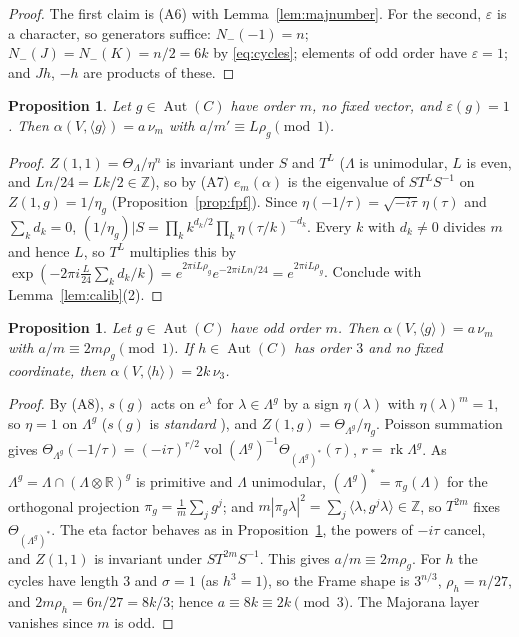 \documentclass[11pt]{amsart}
\newtheorem{proposition}[theorem]{Proposition}
\theoremstyle{definition}
\newcommand{\Z}{\mathbb{Z}}
\newcommand{\R}{\mathbb{R}}
\newcommand{\Aut}{\operatorname{Aut}}
\begin{document}
\begin{proof}
The first claim is (A6) with Lemma~\ref{lem:majnumber}. For the second, $\varepsilon$ is a character, so
generators suffice: $N_-(-1)=n$; $N_-(J)=N_-(K)=n/2=6k$ by \eqref{eq:cycles}; elements of odd order have
$\varepsilon=1$; and $Jh$, $-h$ are products of these.
\end{proof}

\begin{proposition}\label{prop:frame}
Let $g\in\Aut(C)$ have order $m$, no fixed vector, and $\varepsilon(g)=1$. Then
$\alpha(V,\langle g\rangle)=a\,\nu_m$ with $a/m'\equiv L\rho_g\pmod1$.
\end{proposition}

\begin{proof}
$Z(1,1)=\Theta_\Lambda/\eta^n$ is invariant under $S$ and $T^L$ ($\Lambda$ is unimodular, $L$ is even,
and $Ln/24=Lk/2\in\Z$), so by (A7) $e_m(\alpha)$ is the eigenvalue of $ST^LS^{-1}$ on
$Z(1,g)=1/\eta_g$ (Proposition~\ref{prop:fpf}). Since $\eta(-1/\tau)=\sqrt{-i\tau}\,\eta(\tau)$ and
$\sum_kd_k=0$, $(1/\eta_g)|S=\prod_kk^{d_k/2}\prod_k\eta(\tau/k)^{-d_k}$. Every $k$ with $d_k\ne0$
divides $m$ and hence $L$, so $T^L$ multiplies this by
$\exp(-2\pi i\frac L{24}\sum_kd_k/k)=e^{2\pi iL\rho_g}e^{-2\pi iLn/24}=e^{2\pi iL\rho_g}$. Conclude with
Lemma~\ref{lem:calib}(2).
\end{proof}

\begin{proposition}\label{prop:odd}
Let $g\in\Aut(C)$ have odd order $m$. Then $\alpha(V,\langle g\rangle)=a\,\nu_m$ with
$a/m\equiv2m\rho_g\pmod1$. If $h\in\Aut(C)$ has order $3$ and no fixed coordinate, then
$\alpha(V,\langle h\rangle)=2k\,\nu_3$.
\end{proposition}

\begin{proof}
By (A8), $s(g)$ acts on $e^\lambda$ for $\lambda\in\Lambda^g$ by a sign $\eta(\lambda)$ with
$\eta(\lambda)^m=1$, so $\eta=1$ on $\Lambda^g$ ($s(g)$ is \emph{standard} \cite{Lep}), and
$Z(1,g)=\Theta_{\Lambda^g}/\eta_g$. Poisson summation gives
$\Theta_{\Lambda^g}(-1/\tau)=(-i\tau)^{r/2}\operatorname{vol}(\Lambda^g)^{-1}\Theta_{(\Lambda^g)^*}(\tau)$,
$r=\operatorname{rk}\Lambda^g$. As $\Lambda^g=\Lambda\cap(\Lambda\otimes\R)^g$ is primitive and $\Lambda$
unimodular, $(\Lambda^g)^*=\pi_g(\Lambda)$ for the orthogonal projection
$\pi_g=\frac1m\sum_jg^j$; and $m|\pi_g\lambda|^2=\sum_j\langle\lambda,g^j\lambda\rangle\in\Z$, so
$T^{2m}$ fixes $\Theta_{(\Lambda^g)^*}$. The eta factor behaves as in Proposition~\ref{prop:frame}, the
powers of $-i\tau$ cancel, and $Z(1,1)$ is invariant under $ST^{2m}S^{-1}$. This gives $a/m\equiv2m\rho_g$.
For $h$ the cycles have length $3$ and $\sigma=1$ (as $h^3=1$), so the Frame shape is $3^{n/3}$,
$\rho_h=n/27$, and $2m\rho_h=6n/27=8k/3$; hence $a\equiv8k\equiv2k\pmod3$. The Majorana layer vanishes
since $m$ is odd.
\end{proof}
\end{document}
